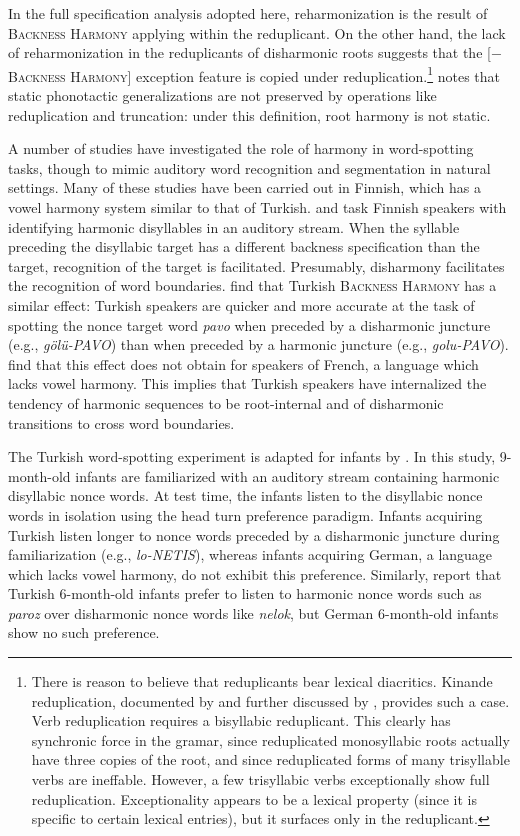 \noindent 
In the full specification analysis adopted here, reharmonization is the result of \textsc{Backness Harmony} applying within the reduplicant. On the other hand, the lack of reharmonization in the reduplicants of disharmonic roots suggests that the [$-$\textsc{Backness Harmony}] exception feature is copied under reduplication.\footnote{There is reason to believe that reduplicants bear lexical diacritics. Kinande reduplication, documented by \citet{Mutaka1990} and further discussed by \citet{Downing2000}, provides such a case. Verb reduplication requires a bisyllabic reduplicant. This clearly has synchronic force in the gramar, since reduplicated monosyllabic roots actually have three copies of the root, and since reduplicated forms of many trisyllable verbs are ineffable. However, a few trisyllabic verbs exceptionally show full reduplication. Exceptionality appears to be a lexical property (since it is specific to certain lexical entries), but it surfaces only in the reduplicant.} \citet{Silverman2000} notes that static phonotactic generalizations are not preserved by operations like reduplication and truncation: under this definition, root harmony is not static.

A number of studies have investigated the role of harmony in word-spotting tasks, though to mimic auditory word recognition and segmentation in natural settings. Many of these studies have been carried out in Finnish, which has a vowel harmony system similar to that of Turkish. \citet{Suomi1997} and \citet{Vroomen1998} task Finnish speakers with identifying harmonic disyllables in an auditory stream. When the syllable preceding the disyllabic target has a different backness specification than the target, recognition of the target is facilitated. Presumably, disharmony facilitates the recognition of word boundaries. \citet{Kabak2010} find that Turkish \textsc{Backness Harmony} has a similar effect: Turkish speakers are quicker and more accurate at the task of spotting the nonce target word \emph{pavo} when preceded by a disharmonic juncture (e.g., \emph{gölü-PAVO}) than when preceded by a harmonic juncture (e.g., \emph{golu-PAVO}). \citet{Kabak2010} find that this effect does not obtain for speakers of French, a language which lacks vowel harmony. This implies that Turkish speakers have internalized the tendency of harmonic sequences to be root-internal and of disharmonic transitions to cross word boundaries. 

The Turkish word-spotting experiment is adapted for infants by \citet{Kampen2008}. In this study, 9-month-old infants are familiarized with an auditory stream containing harmonic disyllabic nonce words. At test time, the infants listen to the disyllabic nonce words in isolation using the head turn preference paradigm. Infants acquiring Turkish listen longer to nonce words preceded by a disharmonic juncture during familiarization (e.g., \emph{lo-NETIS}), whereas infants acquiring German, a language which lacks vowel harmony, do not exhibit this preference. Similarly, \citeauthor{Kampen2008} report that Turkish 6-month-old infants prefer to listen to harmonic nonce words such as \emph{paroz} over disharmonic nonce words like \emph{nelok}, but German 6-month-old infants show no such preference.

